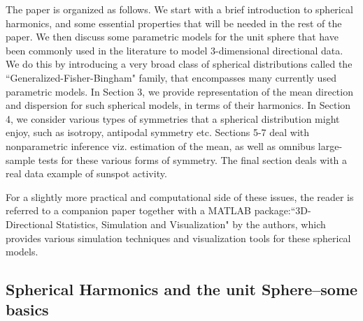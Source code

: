 \documentclass[preprint,11pt,a4paper]{elsarticle}
\begin{document}
The paper is organized as follows. We start with a brief introduction to
spherical harmonics, and some essential properties that will be needed in
the rest of the paper. We then discuss some parametric models for the unit
sphere that have been commonly used in the literature to model 3-dimensional
directional data. We do this by introducing a very broad class of spherical
distributions called the \textquotedblleft Generalized-Fisher-Bingham"
family, that encompasses many currently used parametric models. In Section
3, we provide representation of the mean direction and dispersion for such
spherical models, in terms of their harmonics. In Section 4, we consider
various types of symmetries that a spherical distribution might enjoy, such
as isotropy, antipodal symmetry etc. Sections 5-7 deal with nonparametric
inference viz. estimation of the mean, as well as omnibus large-sample tests
for these various forms of symmetry. The final section deals with a real
data example of sunspot activity.

For a slightly more practical and computational side of these issues, the
reader is referred to a companion paper \cite{TGy_RSJ_WB2017} together with
a MATLAB package:``3D-Directional Statistics, Simulation and Visualization"
by the authors, which provides various simulation techniques and
visualization tools for these spherical models.

\subsection{Spherical Harmonics and the unit Sphere--some basics}
\end{document}
